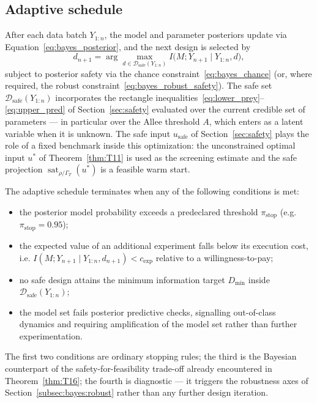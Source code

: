 \subsection{Adaptive schedule}
\label{subsec:bayes:adaptive}

After each data batch $Y_{1:n}$, the model and parameter posteriors update via Equation~\eqref{eq:bayes_posterior}, and the next design is selected by
\begin{equation}
d_{n+1}
= \arg\max_{d \in \mathcal{D}_{\mathrm{safe}}(Y_{1:n})}
I\bigl(M; Y_{n+1} \mid Y_{1:n}, d\bigr),
\label{eq:bayes_adaptive}
\end{equation}
subject to posterior safety via the chance constraint~\eqref{eq:bayes_chance} (or, where required, the robust constraint~\eqref{eq:bayes_robust_safety}). The safe set $\mathcal{D}_{\mathrm{safe}}(Y_{1:n})$ incorporates the rectangle inequalities~\eqref{eq:lower_prey}--\eqref{eq:upper_pred} of Section~\ref{sec:safety} evaluated over the current credible set of parameters --- in particular over the Allee threshold $A$, which enters as a latent variable when it is unknown. The safe input $u_{\mathrm{safe}}$ of Section~\ref{sec:safety} plays the role of a fixed benchmark inside this optimization: the unconstrained optimal input $u^{*}$ of Theorem~\ref{thm:T11} is used as the screening estimate and the safe projection $\operatorname{sat}_{\rho/\Gamma_T}(u^{*})$ is a feasible warm start.

The adaptive schedule terminates when any of the following conditions is met:
\begin{itemize}
\item the posterior model probability exceeds a predeclared threshold $\pi_{\mathrm{stop}}$ (e.g. $\pi_{\mathrm{stop}} = 0.95$);
\item the expected value of an additional experiment falls below its execution cost, i.e. $I(M; Y_{n+1} \mid Y_{1:n}, d_{n+1}) < c_{\mathrm{exp}}$ relative to a willingness-to-pay;
\item no safe design attains the minimum information target $D_{\min}$ inside $\mathcal{D}_{\mathrm{safe}}(Y_{1:n})$;
\item the model set fails posterior predictive checks, signalling out-of-class dynamics and requiring amplification of the model set rather than further experimentation.
\end{itemize}
The first two conditions are ordinary stopping rules; the third is the Bayesian counterpart of the safety-for-feasibility trade-off already encountered in Theorem~\ref{thm:T16}; the fourth is diagnostic --- it triggers the robustness axes of Section~\ref{subsec:bayes:robust} rather than any further design iteration.

